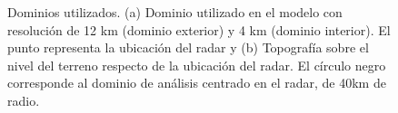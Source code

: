 \documentclass[12pt,spanish,oneside, a4paper]{book}
\begin{document}
\begin{figure}

{\centering {}\hfill{}

}

\caption{Dominios utilizados. (a) Dominio utilizado en el modelo con resolución de 12 km (dominio exterior) y 4 km (dominio interior). El punto representa la ubicación del radar y (b) Topografía sobre el nivel del terreno respecto de la ubicación del radar. El círculo negro corresponde al dominio de análisis centrado en el radar, de 40km de radio. \label{dominio}}\label{fig:dominio}
\end{figure}
\end{document}
